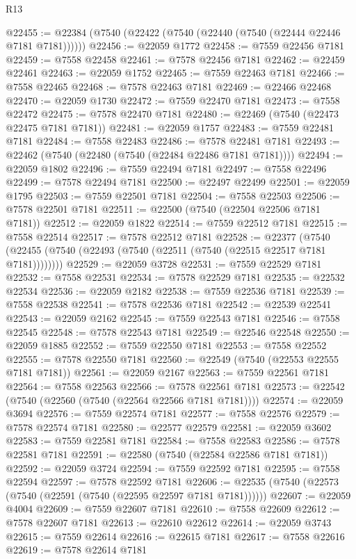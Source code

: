 \begin{lexlean}{R13}
\begin{coremodule}
@22455 := @22384 (@7540 (@22422 (@7540 (@22440 (@7540 (@22444 @22446 @7181 @7181))))))
@22456 := @22059 @1772
@22458 := @7559 @22456 @7181
@22459 := @7558 @22458
@22461 := @7578 @22456 @7181
@22462 := @22459 @22461
@22463 := @22059 @1752
@22465 := @7559 @22463 @7181
@22466 := @7558 @22465
@22468 := @7578 @22463 @7181
@22469 := @22466 @22468
@22470 := @22059 @1730
@22472 := @7559 @22470 @7181
@22473 := @7558 @22472
@22475 := @7578 @22470 @7181
@22480 := @22469 (@7540 (@22473 @22475 @7181 @7181))
@22481 := @22059 @1757
@22483 := @7559 @22481 @7181
@22484 := @7558 @22483
@22486 := @7578 @22481 @7181
@22493 := @22462 (@7540 (@22480 (@7540 (@22484 @22486 @7181 @7181))))
@22494 := @22059 @1802
@22496 := @7559 @22494 @7181
@22497 := @7558 @22496
@22499 := @7578 @22494 @7181
@22500 := @22497 @22499
@22501 := @22059 @1795
@22503 := @7559 @22501 @7181
@22504 := @7558 @22503
@22506 := @7578 @22501 @7181
@22511 := @22500 (@7540 (@22504 @22506 @7181 @7181))
@22512 := @22059 @1822
@22514 := @7559 @22512 @7181
@22515 := @7558 @22514
@22517 := @7578 @22512 @7181
@22528 := @22377
    (@7540 (@22455 (@7540 (@22493 (@7540 (@22511 (@7540 (@22515 @22517 @7181 @7181))))))))
@22529 := @22059 @3728
@22531 := @7559 @22529 @7181
@22532 := @7558 @22531
@22534 := @7578 @22529 @7181
@22535 := @22532 @22534
@22536 := @22059 @2182
@22538 := @7559 @22536 @7181
@22539 := @7558 @22538
@22541 := @7578 @22536 @7181
@22542 := @22539 @22541
@22543 := @22059 @2162
@22545 := @7559 @22543 @7181
@22546 := @7558 @22545
@22548 := @7578 @22543 @7181
@22549 := @22546 @22548
@22550 := @22059 @1885
@22552 := @7559 @22550 @7181
@22553 := @7558 @22552
@22555 := @7578 @22550 @7181
@22560 := @22549 (@7540 (@22553 @22555 @7181 @7181))
@22561 := @22059 @2167
@22563 := @7559 @22561 @7181
@22564 := @7558 @22563
@22566 := @7578 @22561 @7181
@22573 := @22542 (@7540 (@22560 (@7540 (@22564 @22566 @7181 @7181))))
@22574 := @22059 @3694
@22576 := @7559 @22574 @7181
@22577 := @7558 @22576
@22579 := @7578 @22574 @7181
@22580 := @22577 @22579
@22581 := @22059 @3602
@22583 := @7559 @22581 @7181
@22584 := @7558 @22583
@22586 := @7578 @22581 @7181
@22591 := @22580 (@7540 (@22584 @22586 @7181 @7181))
@22592 := @22059 @3724
@22594 := @7559 @22592 @7181
@22595 := @7558 @22594
@22597 := @7578 @22592 @7181
@22606 := @22535 (@7540 (@22573 (@7540 (@22591 (@7540 (@22595 @22597 @7181 @7181))))))
@22607 := @22059 @4004
@22609 := @7559 @22607 @7181
@22610 := @7558 @22609
@22612 := @7578 @22607 @7181
@22613 := @22610 @22612
@22614 := @22059 @3743
@22615 := @7559 @22614
@22616 := @22615 @7181
@22617 := @7558 @22616
@22619 := @7578 @22614 @7181

\end{coremodule}
\end{lexlean}
